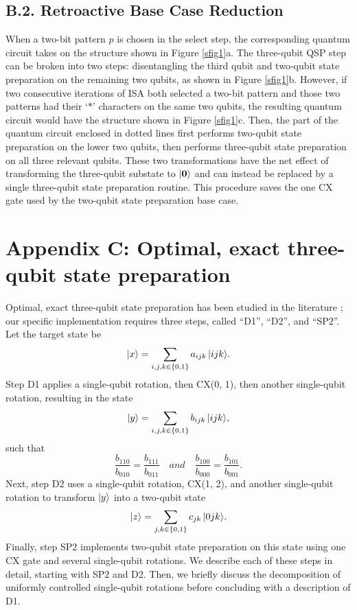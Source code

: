 \subsection*{B.2. Retroactive Base Case Reduction}
When a two-bit pattern $p$ is chosen in the select step, the corresponding quantum
circuit takes on the structure shown in Figure \ref{sfig1}a. The three-qubit QSP step can be broken into two steps: disentangling the third 
qubit and two-qubit state preparation on the remaining two qubits, as shown in 
Figure \ref{sfig1}b. However, if two consecutive iterations of ISA both selected a
two-bit pattern and those 
two patterns had their `$*$' characters on the same two qubits, the resulting 
quantum circuit would have the structure shown in Figure \ref{sfig1}c. Then,
the part of the quantum circuit enclosed in dotted lines first performs 
two-qubit state preparation on the lower two qubits, then performs three-qubit 
state preparation on all three relevant qubits. These two transformations have 
the net effect of transforming the three-qubit substate to $\mathinner{|{\mathbf{0}}\rangle}$ and can
instead be replaced by a single three-qubit state preparation routine. This
procedure saves the one CX gate used by the two-qubit state preparation base
case.

\section*{Appendix C: Optimal, exact three-qubit state preparation}
Optimal, exact three-qubit state preparation has been studied in the 
literature \cite{PhysRevA.77.032320}; our specific implementation requires
three steps, called ``D1'', ``D2'', and ``SP2''. Let the target state be
\begin{equation}
\mathinner{|{x}\rangle} = \sum_{i, j, k \in \{0, 1\}}{a_{ijk}\mathinner{|{ijk}\rangle}}.
\end{equation}
Step D1 applies a single-qubit rotation, then CX(0, 1), then another single-qubit
rotation, resulting in the state
\begin{equation}
\mathinner{|{y}\rangle} = \sum_{i, j, k \in \{0, 1\}}{b_{ijk}\mathinner{|{ijk}\rangle}},
\end{equation}
such that
\begin{equation}
\frac{b_{110}}{b_{010}} = \frac{b_{111}}{b_{011}} \quad 
  and \quad \frac{b_{100}}{b_{000}} = \frac{b_{101}}{b_{001}}.
\end{equation}
Next, step D2 uses a single-qubit rotation, CX(1, 2), and another single-qubit
rotation to transform $\mathinner{|{y}\rangle}$ into a two-qubit state
\begin{equation}
\mathinner{|{z}\rangle} = \sum_{j, k \in \{0, 1\}}{c_{jk}\mathinner{|{0jk}\rangle}}.
\end{equation}
Finally, step SP2 implements two-qubit state preparation on this state using one
CX gate and several single-qubit rotations. We describe each of these steps in detail,
starting with SP2 and D2. Then, we briefly discuss the decomposition of uniformly
controlled single-qubit rotations before concluding with a description of D1.

